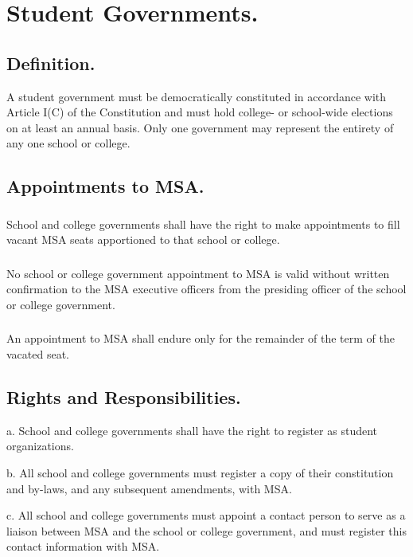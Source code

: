 \section{Student Governments.}

\subsection{Definition.}
A student government must be democratically constituted in accordance with Article I(C) of the Constitution and must hold college- or school-wide elections on at least an annual basis.  Only one government may represent the entirety of any one school or college.

\subsection{Appointments to MSA.}  

\subsubsection{}
School and college governments shall have the right to make appointments to fill vacant MSA seats apportioned to that school or college.

\subsubsection{}
No school or college government appointment to MSA is valid without written confirmation to the MSA executive officers from the presiding officer of the school or college government.

\subsubsection{}
An appointment to MSA shall endure only  for the remainder of the term of the vacated seat.

\subsection{Rights and Responsibilities.}

a. 	School and college governments shall have the right to register as student organizations.

b.	All school and college governments must register a copy of their constitution and by-laws, and any subsequent amendments, with MSA.

c.	All school and college governments must appoint a contact person to serve as a liaison between MSA and the school or college government, and must register this contact information with MSA.

